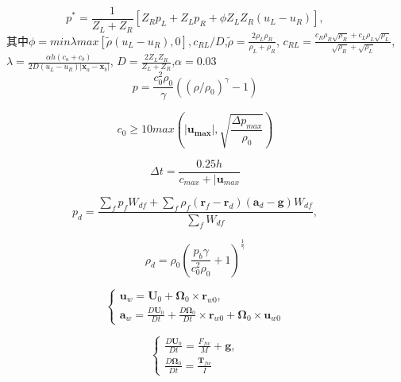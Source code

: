 \documentclass[UTF8]{ctexart}
\begin{document}
\begin{equation}
    p^*=\frac{1}{Z_L+Z_R}[Z_R p_L+Z_L p_R + \phi Z_L Z_R(u_L - u_R)], \qquad 
\end{equation}
其中$\phi = min{\lambda max[\tilde{\rho}(u_L - u_R),0],c_{RL}/D}$,$\tilde{\rho}=\frac{2\rho_L\rho_R}{\rho_L+\rho_R}$,
$c_{RL}=\frac{c_R\rho_R \sqrt{\rho_R}+c_L\rho_L \sqrt{\rho_L}}{\sqrt{\rho_R}+\sqrt{\rho_L}}$,$\lambda=\frac{\alpha h (c_a+c_b)}{2D(u_L-u_R)|\mathbf{x}_a-\mathbf{x}_b|}$,
$D=\frac{2Z_L Z_R}{Z_L + Z_R}$,$\alpha=0.03$\\

\begin{equation}
    p=\frac{c_0^2 \rho_0}{\gamma}((\rho / \rho_0)^\gamma-1) \qquad 
\end{equation}

\begin{equation}
    c_0 \ge 10 max(|\mathbf{u_{max}}|,\sqrt{\frac{\Delta p_{max}}{\rho_0}}) \qquad 
\end{equation}

\begin{equation}
    \Delta t = \frac{0.25h}{c_{max}+|\mathbf{u}_{max}} \qquad 
\end{equation}

\begin{equation}
    p_d = \frac{\sum_{f}p_f W_{df} + \sum_{f}\rho_f(\mathbf{r}_f-\mathbf{r}_d)(\mathbf{a}_d-\mathbf{g})W_{df}}{\sum_{f}W_{df}}, \qquad 
\end{equation}

\begin{equation}
    \rho_d = \rho_0(\frac{p_b \gamma}{c_0^2\rho_0}+1)^{\frac{1}{\gamma}} \qquad 
\end{equation}

\begin{equation}
    \begin{cases} \mathbf{u}_w =  \mathbf{U}_0 + \mathbf{\Omega}_0 \times \mathbf{r}_{w0}, \\
    \mathbf{a}_w = \frac{D \mathbf{U}_0}{Dt}+\frac{D \mathbf{\Omega}_0}{Dt}\times\mathbf{r}_{w0}+\mathbf{\Omega}_0\times\mathbf{u}_{w0} \end{cases} \qquad 
\end{equation}

\begin{equation}
    \begin{cases} \frac{D \mathbf{U}_0}{Dt}=\frac{F_{fw}}{M}+\mathbf{g}, \\
    \frac{D \mathbf{\Omega}_0}{Dt} = \frac{\mathbf{T}_{fw}}{I} \end{cases} \qquad 
\end{equation}
\end{document}
